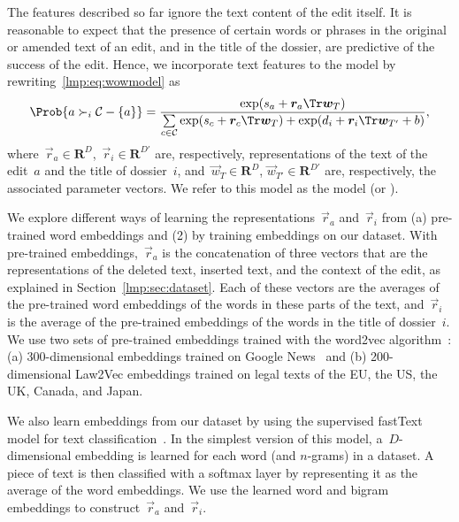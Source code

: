 The features described so far ignore the text content of the edit itself.
It is reasonable to expect that the presence of certain words or phrases in the original or amended text of an edit, and in the title of the dossier, are predictive of the success of the edit.
Hence, we incorporate text features to the \wow{} model by rewriting~\eqref{lmp:eq:wowmodel} as
\begin{equation}
	\label{lmp:eq:wowtext}
	\Prob{ a \succ_i \mathcal{C} - \{ a\} } =\frac{\exp(s_a + \vec{r}_a \Tr \vec{w}_T  ) }{ \sum\limits_{c \in \mathcal{C} } \exp(s_c + \vec{r}_c\Tr \vec{w}_T) + \exp(d_i + \vec{r}_i \Tr \vec{w}_{T'} + b) },
\end{equation}
where~$\vec{r}_a\in \mathbf{R}^{D}$,~$\vec{r}_i \in \mathbf{R}^{D'}$  are, respectively, representations of the text of the edit~$a$ and the title of dossier~$i$, and~$\vec{w}_T  \in \mathbf{R}^{D}$, $\vec{w}_{T'}  \in \mathbf{R}^{D'}$ are, respectively, the associated parameter vectors.
We refer to this model as the  model (or ).

We explore different ways of learning the representations~$\vec{r}_a$ and~$\vec{r}_i$ from (a) pre-trained word embeddings and (2) by training embeddings on our dataset.
With pre-trained embeddings,~$\vec{r}_a$ is the concatenation of three vectors that are the representations of the deleted text, inserted text, and the context of the edit, as explained in Section~\ref{lmp:sec:dataset}.
Each of these vectors are the averages of the pre-trained word embeddings of the words in these parts of the text, and~$\vec{r}_i$ is the average of the pre-trained embeddings of the words in the title of dossier~$i$.
We use two sets of pre-trained embeddings trained with the word2vec algorithm~\cite{mikolov2013distributed}: (a) 300-dimensional embeddings trained on Google News~\cite{google2013word2vec} and (b) 200-dimensional Law2Vec embeddings trained on legal texts of the EU, the US, the UK, Canada, and Japan\cite{chalkidis2019deep}.

We also learn embeddings from our dataset by using the supervised fastText model for text classification~\cite{joulin2017bag}.
In the simplest version of this model, a~$D$-dimensional embedding is learned for each word (and $n$-grams) in a dataset.
A piece of text is then classified with a softmax layer by representing it as the average of the word embeddings.
We use the learned word and bigram embeddings to construct~$\vec{r}_a$ and~$\vec{r}_i$.

